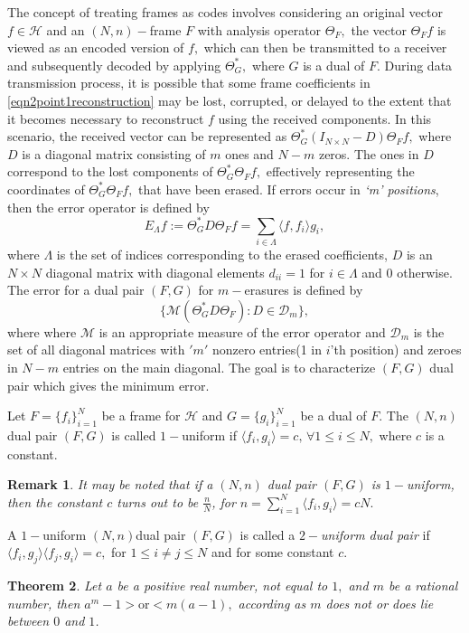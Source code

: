\documentclass[final,1p,times]{elsarticle}
\newtheorem{thm}{Theorem}[section]
\newtheorem{rem}[thm]{Remark}
\begin{document}
	
	\noindent
	The concept of treating frames as codes involves considering an original vector $f \in \mathcal{H}$  and an $(N,n)-$frame $F$ with analysis operator $\Theta_F,$ the vector $\Theta_F f$ is viewed as an encoded version of $f,$ which can then be transmitted to a receiver and subsequently decoded by applying $\Theta_{G}^*,$ where $G$ is a dual of $F.$ During data transmission process, it is possible that some frame coefficients in \eqref{eqn2point1reconstruction} may be lost, corrupted, or delayed to the extent that it becomes necessary to reconstruct $f$ using the received components. In this scenario, the received vector can be represented as $\Theta_{G}^* (I_{N\times N} - D) \Theta_{F} f,$ where $D$ is a diagonal matrix consisting of $m$ ones and $N-m$ zeros. The ones in $D$ correspond to the lost components of $\Theta_{G}^* \Theta_{F} f,$ effectively representing the coordinates of $\Theta_{G}^* \Theta_{F} f,$ that have been erased. If errors occur in \textit{`m' positions}, then the error operator is defined by
	$$E_{\Lambda}f:= \Theta_{G}^*D\Theta_{F} f=\sum_{i\in\Lambda} \langle f,f_i \rangle g_i, $$
	where $\Lambda $ is the set of indices corresponding to the erased coefficients, $D$ is an $N\times N $ diagonal matrix with  diagonal elements $d_{ii}= 1$ for $i\in \Lambda$ and 0 otherwise. The error for a dual pair $(F,G)$ for $m-$erasures is defined by 
	$$  \bigg\{ \mathcal{M} \left(\Theta_{G}^*D\Theta_{F}  \right): D \in \mathcal{D}_m \bigg\}, $$
	where where $\mathcal{M}$ is an appropriate measure of the error operator and $\mathcal{D}_m $ is the set of all diagonal matrices with $'m'$ nonzero entries(1 in $i$'th position) and  zeroes in $N-m$ entries on the main diagonal. The goal is to characterize $(F,G)$ dual pair which gives the minimum error. \\
	
	\begin{defn}
		Let $F = \{f_i\}_{i=1}^N$ be a frame for $\mathcal{H}$ and $G = \{g_i\}_{i=1}^N$ be a dual of $F.$ The $(N,n)$ dual pair $(F,G)$ is  called $1-$uniform if  $\langle f_i, g_i \rangle = c,\,\forall  1 \leq i \leq N,$ where $c$ is a constant. 
	\end{defn}
\begin{rem}\label{rem3point2}
	It may be noted that if a $(N,n)$ dual pair $(F,G)$  is $1-$uniform, then the constant $c$ turns out to be $\frac{n}{N}$, for $n= \sum\limits_{i=1}^N \langle f_i,g_i \rangle= cN.$
\end{rem}

		\begin{defn}
		
		A  $1-$uniform $(N,n) $dual pair $(F,G)$ is called a \textit{ $2-$uniform dual pair} if  $\langle f_i ,g_j \rangle \langle f_j , g_i \rangle = c,$  for $1\leq i \neq j \leq N$ and for some constant $c.$ 
	\end{defn}
\begin{thm}\label{thm2point4minq}
	Let $a$ be a positive real number, not equal to $1,$ and $m$ be a rational number, then $a^m -1 > \text{or} < m(a-1),$ according as $m$ does not or does lie between $0$ and $1$.
\end{thm}
\end{document}
